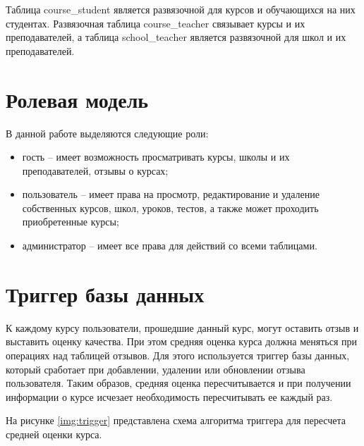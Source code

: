 Таблица course\_student является развязочной для курсов и обучающихся на них студентах. Развязочная таблица course\_teacher связывает курсы и их преподавателей, а таблица school\_teacher является развязочной для школ и их преподавателей.

\section{Ролевая модель}

В данной работе выделяются следующие роли:
\begin{itemize}
	\item гость -- имеет возможность просматривать курсы, школы и их преподавателей, отзывы о курсах;
	\item пользователь -- имеет права на просмотр, редактирование и удаление собственных курсов, школ, уроков, тестов, а также может проходить приобретенные курсы;
	\item администратор -- имеет все права для действий со всеми таблицами.
\end{itemize}

\section{Триггер базы данных}

К каждому курсу пользователи, прошедшие данный курс, могут оставить отзыв и выставить оценку качества. При этом средняя оценка курса должна меняться при операциях над таблицей отзывов. Для этого используется триггер базы данных, который сработает при добавлении, удалении или обновлении отзыва пользователя. Таким образов, средняя оценка пересчитывается и при получении информации о курсе исчезает необходимость пересчитывать ее каждый раз.

На рисунке \ref{img:trigger} представлена схема алгоритма триггера для пересчета средней оценки курса.

